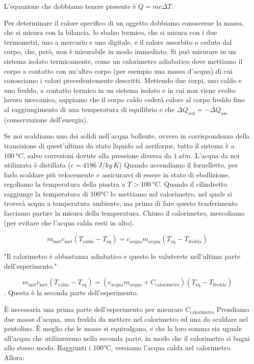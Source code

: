 \documentclass{article}
\begin{document}
    L'equazione che dobbiamo tenere presente è $Q=m c \Delta T$.

    Per determinare il calore specifico di un oggetto dobbiamo conoscerne la massa,
    che si misura con la bilancia, lo sbalzo termico, che si misura con i due
    termometri, uno a mercurio e uno digitale, e il calore assorbito o ceduto dal
    corpo, che, però, non è misurabile in modo immediato.
    Si può misurare in un sistema isolato termicamente, come un calorimetro adiabatico
    dove mettiamo il corpo a contatto con un'altro corpo (per esempio una massa
    d'acqua) di cui conosciamo i valori precedentemente descritti.
    Mettendo due corpi, uno caldo e uno freddo, a contatto termico in un sistema
    isolato e in cui non viene svolto lavoro meccanico, sappiamo che il corpo caldo
    cederà calore al corpo freddo fino al raggiungimento di una temperatura di
    equilibrio e che $\Delta Q_\text{ced}=-\Delta Q_\text{ass}$ (conservazione dell'energia).

    Se noi scaldiamo uno dei solidi  %
    nell'acqua bollente, ovvero in corrispondenza
    della transizione di quest'ultima da stato liquido ad aeriforme, tutto il sistema
    è a $\qty{100}{\degree C}$, salvo correzioni dovute alla pressione diversa da $\qty{1}{atm}$.
    L'acqua da noi utilizzata è distillata ($c=\qty{4186}{J \per kg\,K}$)
    Quando accendiamo il fornelletto, per farlo scaldare più velocemente e assicurarci
    di essere in stato di ebollizione, regoliamo la temperatura della piastra a
    $T>\qty{100}{\degree C}$.
    Quando il cilindretto raggiunge la temperatura di 100°C lo mettiamo nel calorimetro,
    nel quale si troverà acqua a temperatura ambiente, ma prima di fare questo
    trasferimento facciamo partire la misura della temperatura. Chiuso il calorimetro,
    mescoliamo (per evitare che l'acqua calda resti in alto).

    \[
        m_\text{met} c_\text{met} (T_\text{caldo}-T_\text{eq}) =
        c_\text{acqua} m_\text{acqua} (T_\text{eq}-T_\text{fredda})
    \]

    "Il calorimetro è abbastanza adiabatico e questo lo valuterete nell'ultima parte
    dell'esperimento."

    \[
        m_\text{met} c_\text{met} (T_\text{caldo}-T_\text{eq}) =
        (c_\text{acqua} m_\text{acqua} + C_\text{calorimetro}) (T_\text{eq}-T_\text{fredda})
    \]. Questa è la seconda parte dell'esperimento.

    È necessaria una prima parte dell'esperimento per misurare $C_\text{calorimetro}$
    Prendiamo due masse d'acqua, una fredda da mettere nel calorimetro ed una da
    scaldare nel pentolino. È meglio che le masse si equivalgano, e che la loro
    somma sia uguale all'acqua che utilizzeremo nella seconda parte, in modo che
    il calorimetro si bagni allo stesso modo.
    Raggiunti i 100°C, versiamo l'acqua calda nel calorimetro. Allora:
\end{document}
